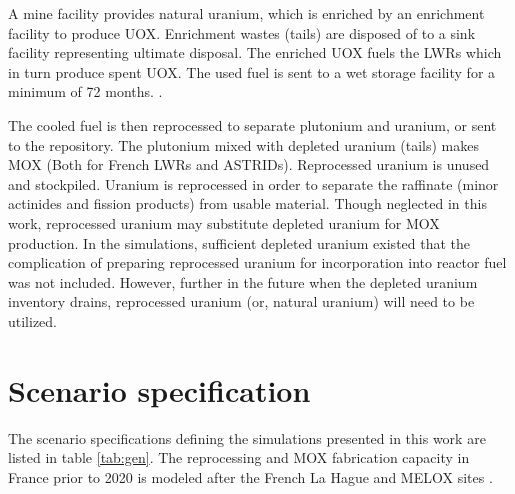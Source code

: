 A mine facility provides natural uranium, which is enriched by an enrichment
facility to produce \gls{UOX}. Enrichment wastes (tails) are disposed of to a 
sink facility representing ultimate disposal. The enriched \gls{UOX} fuels
the \glspl{LWR} which in turn produce spent \gls{UOX}. The used fuel
is sent to a wet storage facility for a minimum of 72 months. \cite{carre_overview_2009}.

The cooled fuel is then reprocessed to separate plutonium and uranium,
or sent to the repository.
The plutonium mixed with depleted uranium (tails) makes \gls{MOX} (Both for
French \glspl{LWR} and \glspl{ASTRID}).
Reprocessed uranium is unused and stockpiled. Uranium is reprocessed
in order to separate the raffinate (minor actinides and fission products)
from usable material. Though neglected in this work, reprocessed
uranium may substitute depleted uranium for \gls{MOX} production. In the
simulations, sufficient depleted uranium existed that the complication of
preparing reprocessed uranium for incorporation into reactor fuel
was not included. However, further in the future when the depleted
uranium inventory drains, reprocessed uranium (or, natural uranium) will need to be utilized. 

\FloatBarrier
\section{Scenario specification}


The scenario specifications defining the simulations presented in this work 
are listed in table \ref{tab:gen}.
The reprocessing and \gls{MOX} fabrication capacity in France
prior to 2020 is modeled after the 
French La Hague and MELOX sites \cite{schneider_spent_2008, hugelmann_melox_1999}.


